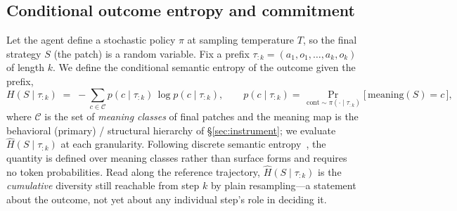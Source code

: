 \documentclass[11pt]{article}
\newcommand{\Hk}{\widehat{H}\!\left(S \mid \tau_{:k}\right)}
\newcommand{\strat}{S}
\newcommand{\prefix}{\tau_{:k}}
\begin{document}
\subsection{Conditional outcome entropy and commitment}
\label{sec:measure}
Let the agent define a stochastic policy $\pi$ at sampling temperature $T$, so the
final strategy $\strat$ (the patch) is a random variable. Fix a prefix
$\prefix=(a_1,o_1,\dots,a_k,o_k)$ of length $k$. We define the conditional
semantic entropy of the outcome given the prefix,
\begin{equation}
H(\strat \mid \prefix)\;=\;-\!\!\sum_{c \in \mathcal{C}} p(c\mid\prefix)\,\log p(c\mid\prefix),
\qquad
p(c\mid\prefix)=\Pr_{\,\text{cont}\sim\pi(\cdot\mid\prefix)}\!\big[\,\text{meaning}(\strat)=c\,\big],
\end{equation}
where $\mathcal{C}$ is the set of \emph{meaning classes} of final patches and the
meaning map is the behavioral (primary) / structural hierarchy of
\S\ref{sec:instrument}; we evaluate $\Hk$ at each granularity. Following discrete
semantic entropy~\citep{farquhar2024semantic,kuhn2023semantic}, the quantity is
defined over meaning classes rather than surface forms and requires no token
probabilities. Read along the reference trajectory, $\Hk$ is the \emph{cumulative}
diversity still reachable from step $k$ by plain resampling---a statement about the
outcome, not yet about any individual step's role in deciding it.
\end{document}

